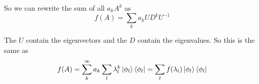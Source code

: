 \documentclass[a4paper,german,12pt,smallheadings]{scrartcl}
\begin{document}
\begin{enumerate}[a)]
    So we can rewrite the sum of all $a_k A^k$ as
    \begin{equation*}
      f(A) = \sum_{k} a_k UD^kU^{-1}
    \end{equation*}

    The $U$ contain the eigenvectors and the $D$ contain the eigenvalues. So
    this is the same as
    \begin{equation*}
      f(A) 
      = \sum_{k}^{\infty} a_k \sum_{l} \lambda_l^k \ket{\phi_l}\bra{\phi_l}
      = \sum_{l} f(\lambda_l) \ket{\phi_l}\bra{\phi_l}
    \end{equation*}


\end{enumerate}
\end{document}

